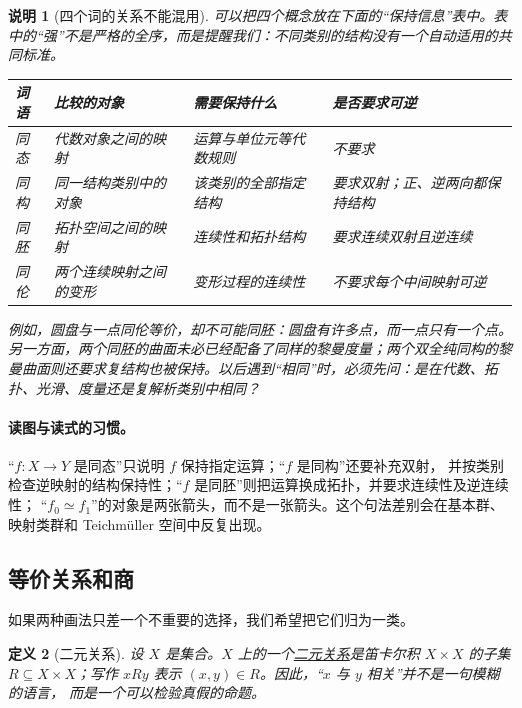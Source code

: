 \documentclass[UTF8,fontset=none,a4paper,11pt]{ctexart}
\theoremstyle{foundation-definition}
\newtheorem{definition}{定义}[section]
\theoremstyle{foundation-theorem}
\theoremstyle{foundation-proposition}
\theoremstyle{foundation-example}
\theoremstyle{foundation-remark}
\newtheorem{remark}[definition]{说明}
\theoremstyle{foundation-theorem}
\newcommand{\term}[2]{\hyperref[#1]{#2}}
\begin{document}
\begin{remark}[四个词的关系不能混用]
可以把四个概念放在下面的“保持信息”表中。表中的“强”不是严格的全序，而是提醒我们：不同类别的结构没有一个自动适用的共同标准。

\begin{center}
{\setlength{\tabcolsep}{3pt}
\begin{tabular}{p{}|p{}|p{}|p{}}
\toprule
词语 & 比较的对象 & 需要保持什么 & 是否要求可逆 \\
\midrule
同态 & 代数对象之间的映射 & 运算与单位元等代数规则 & 不要求 \\
同构 & 同一结构类别中的对象 & 该类别的全部指定结构 & 要求双射；正、逆两向都保持结构 \\
同胚 & 拓扑空间之间的映射 & 连续性和拓扑结构 & 要求连续双射且逆连续 \\
同伦 & 两个连续映射之间的变形 & 变形过程的连续性 & 不要求每个中间映射可逆 \\
\bottomrule
\end{tabular}
}
\end{center}

例如，圆盘与一点同伦等价，却不可能同胚：圆盘有许多点，而一点只有一个点。另一方面，两个同胚的曲面未必已经配备了同样的黎曼度量；两个双全纯同构的黎曼曲面则还要求复结构也被保持。以后遇到“相同”时，必须先问：是在代数、拓扑、光滑、度量还是复解析类别中相同？
\end{remark}

\paragraph{读图与读式的习惯。}
“\(f:X\to Y\) 是同态”只说明 \(f\) 保持指定运算；“\(f\) 是同构”还要补充双射，
并按类别检查逆映射的结构保持性；“\(f\) 是同胚”则把运算换成拓扑，并要求连续性及逆连续性；
“\(f_0\simeq f_1\)”的对象是两张箭头，而不是一张箭头。这个句法差别会在基本群、映射类群和
Teichmüller 空间中反复出现。

\subsection{等价关系和商}

如果两种画法只差一个不重要的选择，我们希望把它们归为一类。

\begin{definition}[二元关系]\label{def:relation}
设 \(X\) 是集合。\(X\) 上的一个\term{def:relation}{二元关系}是笛卡尔积
\(X\times X\) 的子集 \(R\subseteq X\times X\)；写作 \(xRy\) 表示
\((x,y)\in R\)。因此，“\(x\) 与 \(y\) 相关”并不是一句模糊的语言，
而是一个可以检验真假的命题。
\end{definition}
\end{document}
